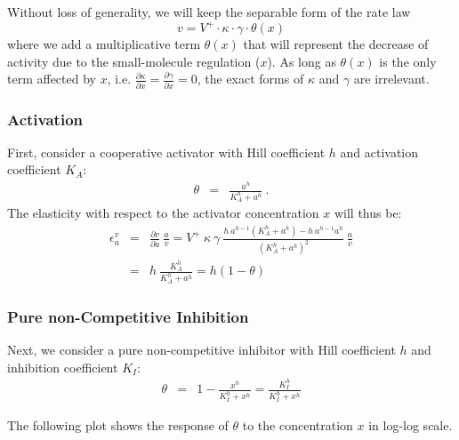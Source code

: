 \documentclass[12pt,a4paper]{article}
\begin{document}
Without loss of generality, we will keep the separable form of the rate law
\[v = V^+ \cdot \kappa \cdot \gamma \cdot \theta(x)\]
where we add a multiplicative term $\theta(x)$ that will represent the decrease of activity due to the small-molecule regulation ($x$). As long as $\theta(x)$ is the only term affected by $x$, i.e. $\frac{\partial \kappa}{\partial x} = \frac{\partial \gamma}{\partial x} = 0$, the exact forms of $\kappa$ and $\gamma$ are irrelevant.

\subsubsection{Activation}
First, consider a cooperative \cite{Barcroft1910-rx, Monod1965-dq} activator with Hill coefficient $h$ and activation coefficient $K_A$:
\begin{eqnarray}
    \theta &=& \frac{a^h}{K_A^h + a^h}~.
\end{eqnarray}
The elasticity with respect to the activator concentration $x$ will thus be:
\begin{eqnarray}
    \epsilon_a^v &=& \frac{\partial v}{\partial a} ~ \frac{a}{v} = V^+ ~ \kappa ~ \gamma ~ \frac{h~a^{h-1} (K_A^h + a^h) - h~a^{h-1} a^h}{(K_A^h + a^h)^2}~\frac{a}{v} \nonumber \\
    &=& h~\frac{K_A^h}{K_A^h + a^h} = h (1 - \theta) \label{eq:eps_act}
\end{eqnarray}

\subsubsection{Pure non-Competitive Inhibition}
\label{sec:non_conpetitive_inhitibion}
Next, we consider a pure non-competitive inhibitor with Hill coefficient $h$ and inhibition coefficient $K_I$:
\begin{eqnarray}
    \theta &=& 1 - \frac{x^h}{K_I^h + x^h} = \frac{K_I^h}{K_I^h + x^h}
\end{eqnarray}

The following plot shows the response of $\theta$ to the concentration $x$ in log-log scale.

\begin{center}
\end{center}
\end{document}
